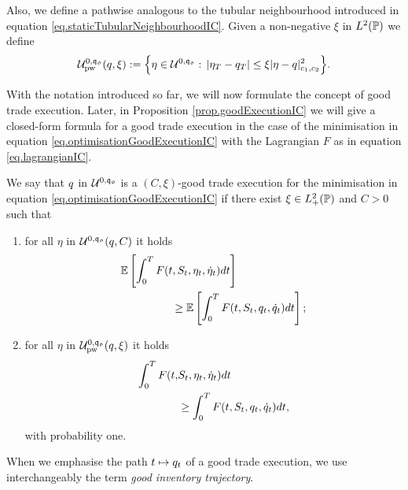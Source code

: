 \documentclass[10pt,a4paper]{article}
\begin{document}
Also, we define a pathwise analogous to the tubular neighbourhood introduced in equation \eqref{eq.staticTubularNeighbourhoodIC}. Given a non-negative $\xi$ in $L^{2}({\mathbb{P}})$ we define
\begin{equation}\label{eq.pathwiseTuburalNeighbourhoodIC}
\mathcal{U}^{0,\mathfrak{q_0}}_{\text{pw}}(q,\xi):=
\Big\lbrace
\eta \in \mathcal{U}^{0,\mathfrak{q_0}} : \, 
\left\lvert {\eta_T-q_T} \right\rvert 
\leq \xi \lvert \eta-q \rvert_{c_{1},c_{2}}^{2}
\Big\rbrace.
\end{equation}

With the notation introduced so far, we will now formulate the concept of good trade execution. Later, in Proposition \ref{prop.goodExecutionIC} we will give a closed-form formula for a good trade execution in the case of the minimisation in equation \eqref{eq.optimisationGoodExecutionIC} with the Lagrangian $F$ as in equation \eqref{eq.lagrangianIC}.

\begin{defi}\label{defi.goodTradeExecution}
We say that $q$ in $\mathcal{U}^{0,\mathfrak{q_0}}$ is a $(C,\xi)$-good trade execution for the minimisation in equation \eqref{eq.optimisationGoodExecutionIC} if there exist $\xi \in L^{2}_{+} ({\mathbb{P}})$ and $C>0$ such that 
\begin{enumerate}
\item for all $\eta$ in $\mathcal{U}^{0,\mathfrak{q_0}}(q,C)$ it holds
\begin{equation*}
\begin{split}
		 \mathbb{{E}} &  \left[	\int_{0}^{T}   F(t,S_t, \eta_t , \dot{\eta}_t )dt \right] \\
& \qquad \qquad \geq 
			  \mathbb{{E}}\left[ \int_{0}^{T}  F(t,S_t, q_t,\dot{q}_t)dt\right];
\end{split}
\end{equation*}
\item for all $\eta$ in $\mathcal{U}^{0,\mathfrak{q_0}}_{\text{pw}}(q,\xi)$ it holds
\begin{equation*}
\begin{split}
\int_{0}^{T}F(t,&S_t,\eta_t ,\dot{\eta}_t )dt \\
&\geq
 		\int_{0}^{T} F(t,S_t, q_t,\dot{q}_t)dt,
\end{split}
\end{equation*}
with probability one.
\end{enumerate}
\end{defi}
When we emphasise the path $t\mapsto q_t$ of a good trade execution, we use  interchangeably the term \emph{good inventory trajectory}.
\end{document}
